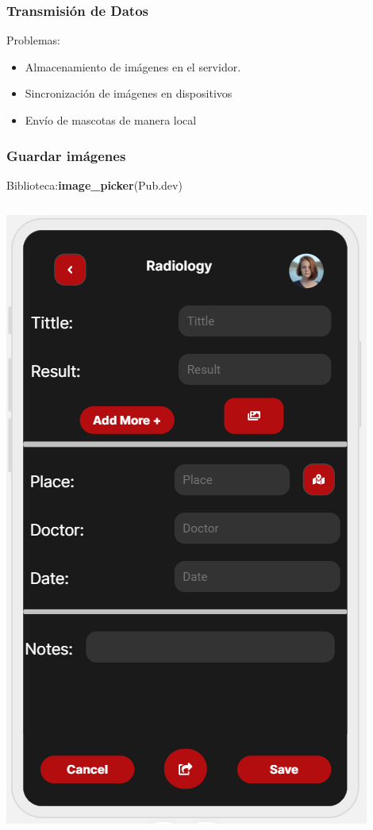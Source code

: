 \documentclass[14pt]{beamer}
\begin{document}
\begin{frame}
\frametitle{Transmisión de Datos}
Problemas:
\begin{itemize}
\item Almacenamiento de imágenes en el servidor.
\item Sincronización de imágenes en dispositivos
\item Envío de mascotas de manera local
\end{itemize}


\end{frame}
\begin{frame}
\frametitle{Guardar imágenes}
Biblioteca:\textbf{image\_picker}(Pub.dev)
\begin{columns}
\begin{column}{0.5\textwidth}
\begin{center}

\includegraphics[scale = 0.32]{Images/photoExample.png}


\end{center}
\end{column}
\end{columns}
\end{frame}
\end{document}
